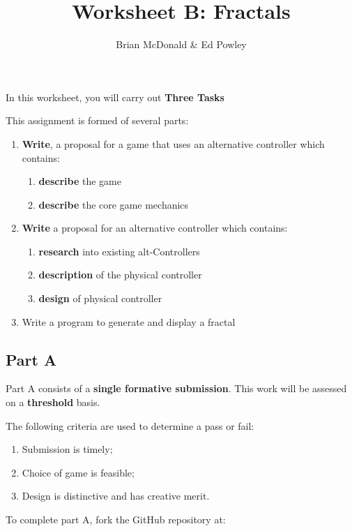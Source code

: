 \documentclass{../../../fal_assignment}
\title{Worksheet B: Fractals}
\author{Brian McDonald \& Ed Powley}
\begin{document}
\maketitle

In this worksheet, you will carry out \textbf{Three Tasks}

This assignment is formed of several parts:

\begin{enumerate}[label=(\Alph*)]
	\item \textbf{Write}, a proposal for a game that uses an alternative controller which contains:
	\begin{enumerate}[label=\roman*.]
		\item \textbf{describe} the game
		\item \textbf{describe} the core game mechanics
	\end{enumerate}
	\item \textbf{Write} a proposal for an alternative controller which contains: 
	\begin{enumerate}[label=\roman*.]
		\item \textbf{research} into existing alt-Controllers
		\item \textbf{description} of the physical controller
		\item \textbf{design} of physical controller
	\end{enumerate}
	\item {Write} a program to generate and display a fractal
\end{enumerate}


\subsection*{Part A}

Part A consists of a \textbf{single formative submission}. This work will be assessed on a \textbf{threshold} basis. 

The following criteria are used to determine a pass or fail:

\begin{enumerate}[label=(\alph*)]
	\item Submission is timely;
	\item Choice of game is feasible;
	\item Design is distinctive and has creative merit.
\end{enumerate}

To complete part A, fork the GitHub repository at:
\end{document}
